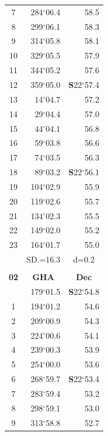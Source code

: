 \documentclass[10pt, a4paper]{report}
\begin{document}
\begin{scriptsize}
\begin{tabular*}{0.2\textwidth}[t]{@{\extracolsep{\fill}}|c|rr|}
7 & 284$^\circ$06.4 & 58.5\\
8 & 299$^\circ$06.1 & 58.3\\
9 & 314$^\circ$05.8 & \raisebox{0.24ex}{\boldmath$\cdot$~\boldmath$\cdot$~~}58.1\\
10 & 329$^\circ$05.5 & 57.9\\
11 & 344$^\circ$05.2 & 57.6\\[2Pt]
12 & 359$^\circ$05.0 & \textbf{S}22$^\circ$57.4\\
13 & 14$^\circ$04.7 & 57.2\\
14 & 29$^\circ$04.4 & 57.0\\
15 & 44$^\circ$04.1 & \raisebox{0.24ex}{\boldmath$\cdot$~\boldmath$\cdot$~~}56.8\\
16 & 59$^\circ$03.8 & 56.6\\
17 & 74$^\circ$03.5 & 56.3\\[2Pt]
18 & 89$^\circ$03.2 & \textbf{S}22$^\circ$56.1\\
19 & 104$^\circ$02.9 & 55.9\\
20 & 119$^\circ$02.6 & 55.7\\
21 & 134$^\circ$02.3 & \raisebox{0.24ex}{\boldmath$\cdot$~\boldmath$\cdot$~~}55.5\\
22 & 149$^\circ$02.0 & 55.2\\
23 & 164$^\circ$01.7 & 55.0\\
\hline
\rule{0pt}{2.4ex} & \multicolumn{1}{c}{SD.=16.3} & \multicolumn{1}{c|}{d=0.2}\\
\hline
\multicolumn{1}{c}{}\\[-0.5ex]\hline
\multicolumn{1}{|c|}{\rule{0pt}{2.6ex}\textbf{02}} & \multicolumn{1}{c}{\textbf{GHA}} & \multicolumn{1}{c|}{\textbf{Dec}}\\
\hline\rule{0pt}{2.6ex}\noindent
0 & 179$^\circ$01.5 & \textbf{S}22$^\circ$54.8\\
1 & 194$^\circ$01.2 & 54.6\\
2 & 209$^\circ$00.9 & 54.3\\
3 & 224$^\circ$00.6 & \raisebox{0.24ex}{\boldmath$\cdot$~\boldmath$\cdot$~~}54.1\\
4 & 239$^\circ$00.3 & 53.9\\
5 & 254$^\circ$00.0 & 53.6\\[2Pt]
6 & 268$^\circ$59.7 & \textbf{S}22$^\circ$53.4\\
7 & 283$^\circ$59.4 & 53.2\\
8 & 298$^\circ$59.1 & 53.0\\
9 & 313$^\circ$58.8 & \raisebox{0.24ex}{\boldmath$\cdot$~\boldmath$\cdot$~~}52.7\\

\end{tabular*}
\end{scriptsize}
\end{document}
